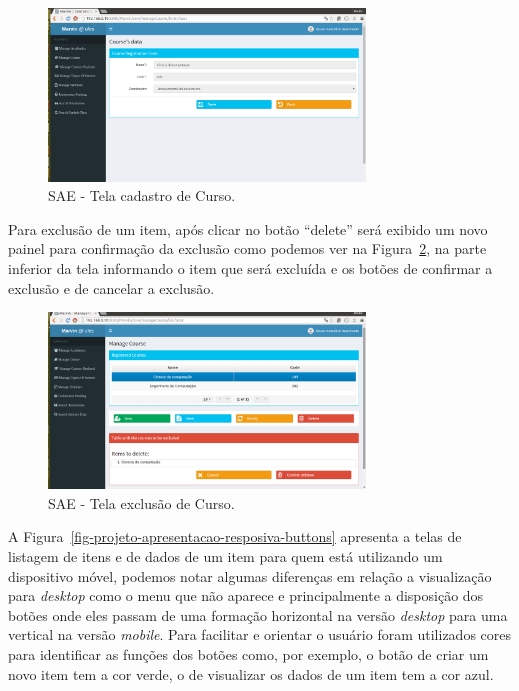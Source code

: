 \begin{figure}[h]
	\centering
	\includegraphics[width=0.75\textwidth]{figuras/projeto/fig-projeto-apresentacao-course-form}
	\caption{SAE - Tela cadastro de Curso.}
	\label{fig-projeto-apresentacao-course-form}
\end{figure}


\newpage
Para exclusão de um item, após clicar no botão ``delete'' será exibido um novo painel para confirmação da exclusão como podemos ver na Figura~\ref{fig-projeto-apresentacao-course-excluir}, na parte inferior da tela informando o item que será excluída e os botões de confirmar a exclusão e de cancelar a exclusão. 

\begin{figure}[h]
	\centering
	\includegraphics[width=0.75\textwidth]{figuras/projeto/fig-projeto-apresentacao-course-excluir}
	\caption{SAE - Tela exclusão de Curso.}
	\label{fig-projeto-apresentacao-course-excluir}
\end{figure}



A Figura~\ref{fig-projeto-apresentacao-resposiva-buttons} apresenta a telas de listagem de itens e de dados de um item para quem  está utilizando um dispositivo móvel, podemos notar algumas diferenças em relação a visualização para \textit{desktop} como o menu que não aparece e principalmente a disposição dos botões onde eles passam de uma formação horizontal na versão \textit{desktop} para uma vertical na versão \textit{mobile}. Para facilitar e orientar o usuário foram utilizados cores para identificar as funções dos botões como, por exemplo, o botão de criar um novo item tem a cor verde, o de visualizar os dados de um item tem a cor azul.


